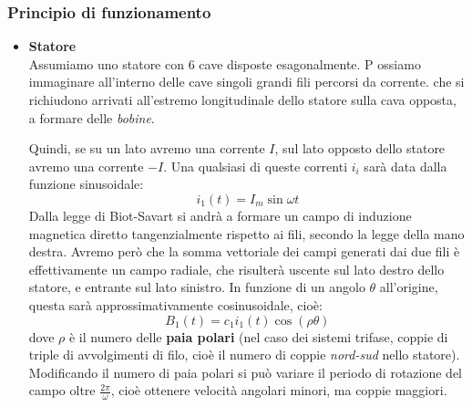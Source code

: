 \documentclass[a4paper,11pt]{article}
\begin{document}
\subsubsection{Principio di funzionamento}
\begin{itemize}
	\item \textbf{\textsf{Statore}} \\ 
	Assumiamo uno statore con 6 cave disposte esagonalmente. P
	ossiamo immaginare all'interno delle cave singoli grandi fili percorsi da corrente. che si richiudono arrivati all'estremo longitudinale dello statore sulla cava opposta, a formare delle \textit{bobine}. 
	\begin{center}
	\end{center}
Quindi, se su un lato avremo una corrente $I$, sul lato opposto dello statore avremo una corrente $-I$.
Una qualsiasi di queste correnti $i_i$ sarà data dalla funzione sinusoidale:
$$
i_1(t) = I_m \sin{\omega t}
$$ 
Dalla legge di Biot-Savart si andrà a formare un campo di induzione magnetica diretto tangenzialmente rispetto ai fili, secondo la legge della mano destra.
Avremo però che la somma vettoriale dei campi generati dai due fili  è effettivamente un campo radiale, che risulterà uscente sul lato destro dello statore, e entrante sul lato sinistro.
In funzione di un angolo $\theta$ all'origine, questa sarà approssimativamente cosinusoidale, cioè:
$$
B_1(t) = c_1 i_1(t) \cos (\rho \theta)
$$
dove $\rho$ è il numero delle \textbf{paia polari} (nel caso dei sistemi trifase, coppie di triple di avvolgimenti di filo, cioè il numero di coppie \textit{nord-sud} nello statore).
Modificando il numero di paia polari si può variare il periodo di rotazione del campo oltre $\frac{2\pi}{\omega}$, cioè ottenere velocità angolari minori, ma coppie maggiori.


\end{itemize}
\end{document}
